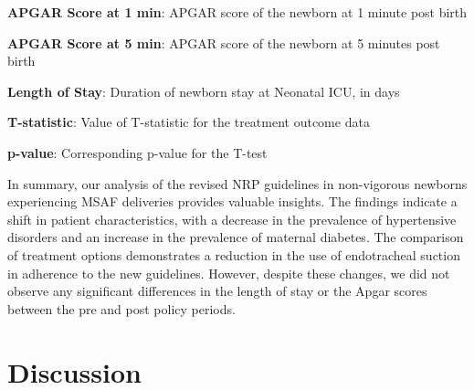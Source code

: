 \documentclass[11pt]{article}
\begin{document}
\begin{table}[h]
\caption{Comparison of outcomes pre and post policy implementation measured by duration of stay and Apgar scores}
\label{table:outcome_comparison}
\begin{threeparttable}
\renewcommand{\TPTminimum}{\linewidth}
\begin{tablenotes}
\footnotesize
\item \textbf{APGAR Score at 1 min}: APGAR score of the newborn at 1 minute post birth
\item \textbf{APGAR Score at 5 min}: APGAR score of the newborn at 5 minutes post birth
\item \textbf{Length of Stay}: Duration of newborn stay at Neonatal ICU, in days
\item \textbf{T-statistic}: Value of T-statistic for the treatment outcome data
\item \textbf{p-value}: Corresponding p-value for the T-test
\end{tablenotes}
\end{threeparttable}
\end{table}


In summary, our analysis of the revised NRP guidelines in non-vigorous newborns experiencing MSAF deliveries provides valuable insights. The findings indicate a shift in patient characteristics, with a decrease in the prevalence of hypertensive disorders and an increase in the prevalence of maternal diabetes. The comparison of treatment options demonstrates a reduction in the use of endotracheal suction in adherence to the new guidelines. However, despite these changes, we did not observe any significant differences in the length of stay or the Apgar scores between the pre and post policy periods.

\section*{Discussion}
\end{document}
